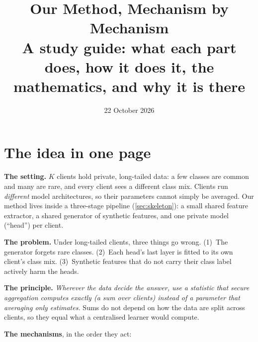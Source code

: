 \documentclass[11pt]{article}
\title{\textbf{Our Method, Mechanism by Mechanism}\\[4pt]
\large A study guide: what each part does, how it does it, the mathematics, and why it is there}
\author{}
\date{22 October 2026}
\theoremstyle{plain}
\theoremstyle{definition}
\begin{document}
\maketitle
\vspace{-1.5em}
\setcounter{tocdepth}{1}
\tableofcontents
\newpage

\section{The idea in one page}

\textbf{The setting.} $K$ clients hold private, long-tailed data: a few classes are common and many are rare, and
every client sees a different class mix. Clients run \emph{different} model architectures, so their parameters cannot
simply be averaged. Our method lives inside a three-stage pipeline (\cref{sec:skeleton}): a small shared feature
extractor, a shared generator of synthetic features, and one private model (``head'') per client.

\textbf{The problem.} Under long-tailed clients, three things go wrong. (1)~The generator forgets rare classes.
(2)~Each head's last layer is fitted to its own client's class mix. (3)~Synthetic features that do not carry their
class label actively harm the heads.

\textbf{The principle.} \emph{Wherever the data decide the answer, use a statistic that secure aggregation computes
exactly (a sum over clients) instead of a parameter that averaging only estimates.} Sums do not depend on how the
data are split across clients, so they equal what a centralised learner would compute.

\textbf{The mechanisms}, in the order they act:
\end{document}
